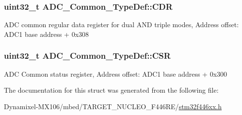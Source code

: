 \subsubsection[{\texorpdfstring{C\+DR}{CDR}}]{ uint32\+\_\+t A\+D\+C\+\_\+\+Common\+\_\+\+Type\+Def\+::\+C\+DR}\hypertarget{struct_a_d_c___common___type_def_a6f7399bf70f677ef5de46a3038f414e1}{}\label{struct_a_d_c___common___type_def_a6f7399bf70f677ef5de46a3038f414e1}
A\+DC common regular data register for dual A\+ND triple modes, Address offset\+: A\+D\+C1 base address + 0x308 
\subsubsection[{\texorpdfstring{C\+SR}{CSR}}]{ uint32\+\_\+t A\+D\+C\+\_\+\+Common\+\_\+\+Type\+Def\+::\+C\+SR}\hypertarget{struct_a_d_c___common___type_def_ac38e24f600f9e134a54a0c43b976a4f4}{}\label{struct_a_d_c___common___type_def_ac38e24f600f9e134a54a0c43b976a4f4}
A\+DC Common status register, Address offset\+: A\+D\+C1 base address + 0x300 

The documentation for this struct was generated from the following file\+:\begin{DoxyCompactItemize}
\item 
Dynamixel-\/\+M\+X106/mbed/\+T\+A\+R\+G\+E\+T\+\_\+\+N\+U\+C\+L\+E\+O\+\_\+\+F446\+R\+E/\hyperlink{stm32f446xx_8h}{stm32f446xx.\+h}\end{DoxyCompactItemize}

